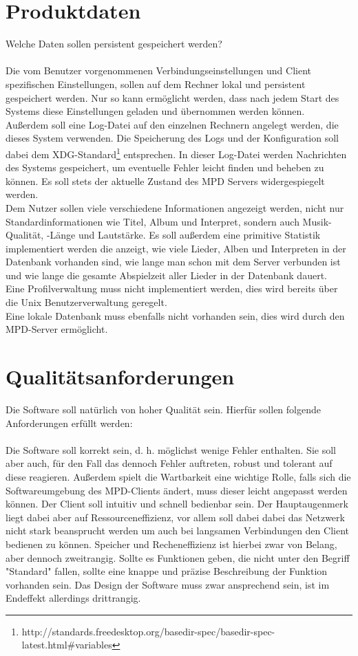 \section{Produktdaten}
Welche Daten sollen persistent gespeichert werden?\ \\ \\
Die vom Benutzer vorgenommenen Verbindungseinstellungen und Client spezifischen Einstellungen,
sollen auf dem Rechner lokal und persistent gespeichert werden. Nur so kann ermöglicht werden,
dass nach jedem Start des Systems diese Einstellungen geladen und übernommen werden können.\ \\
Außerdem soll eine Log-Datei auf den einzelnen Rechnern angelegt werden, die dieses System
verwenden. Die Speicherung des Logs und der Konfiguration soll dabei dem XDG-Standard\footnote{http://standards.freedesktop.org/basedir-spec/basedir-spec-latest.html\#variables} entsprechen. 
In dieser Log-Datei werden Nachrichten des Systems gespeichert, um eventuelle Fehler
leicht finden und beheben zu können. Es soll stets der aktuelle Zustand des MPD Servers widergespiegelt werden.
\\
Dem Nutzer sollen viele verschiedene Informationen angezeigt werden, nicht nur Standardinformationen
wie Titel, Album und Interpret, sondern auch Musik-Qualität, -Länge und Lautstärke.
Es soll außerdem eine primitive Statistik implementiert werden die anzeigt, wie viele Lieder, Alben und
Interpreten in der Datenbank vorhanden sind, wie lange man schon mit dem Server verbunden ist und wie 
lange die gesamte Abspielzeit aller Lieder in der Datenbank dauert.\ \\
Eine Profilverwaltung muss nicht implementiert werden, dies wird bereits über die Unix Benutzerverwaltung geregelt.\ \\
Eine lokale Datenbank muss ebenfalls nicht vorhanden sein, dies wird durch den MPD-Server ermöglicht.\ \\

\section{Qualitätsanforderungen}
Die Software soll natürlich von hoher Qualität sein. Hierfür sollen folgende
Anforderungen erfüllt werden:\ 
\\
\\
Die Software soll korrekt sein, d. h. möglichst wenige Fehler enthalten.
Sie soll aber auch, für den Fall das dennoch Fehler auftreten, robust
und tolerant auf diese reagieren. Außerdem spielt die Wartbarkeit 
eine wichtige Rolle, falls sich die Softwareumgebung des MPD-Clients
ändert, muss dieser leicht angepasst werden können.
Der Client soll intuitiv und schnell bedienbar sein.
Der Hauptaugenmerk liegt dabei aber auf Ressourceneffizienz, vor allem soll dabei dabei 
das Netzwerk nicht stark beansprucht werden um auch bei langsamen Verbindungen den Client
bedienen zu können. Speicher und Recheneffizienz ist hierbei zwar von Belang, aber dennoch zweitrangig. 
Sollte es Funktionen geben, die nicht unter den Begriff "Standard" fallen, sollte eine knappe
und präzise Beschreibung der Funktion vorhanden sein.
Das Design der Software muss zwar ansprechend sein, ist im Endeffekt allerdings drittrangig.

